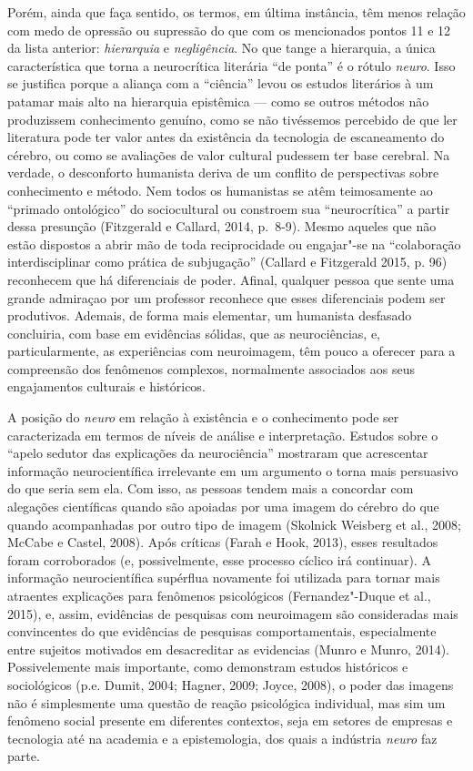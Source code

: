 Porém, ainda que faça sentido, os termos, em última instância, têm menos
relação com medo de opressão ou supressão do que com os mencionados
pontos 11 e 12 da lista anterior: \emph{hierarquia} e
\emph{negligência}. No que tange a hierarquia, a única característica
que torna a neurocrítica literária ``de ponta'' é o rótulo \emph{neuro}.
Isso se justifica porque a aliança com a ``ciência'' levou os estudos
literários à um patamar mais alto na hierarquia epistêmica --- como se
outros métodos não produzissem conhecimento genuíno, como se não
tivéssemos percebido de que ler literatura pode ter valor antes da
existência da tecnologia de escaneamento do cérebro, ou como se
avaliações de valor cultural pudessem ter base cerebral. Na verdade, o
desconforto humanista deriva de um conflito de perspectivas sobre
conhecimento e método. Nem todos os humanistas se atêm teimosamente ao
``primado ontológico'' do sociocultural ou constroem sua
``neurocrítica'' a partir dessa presunção (Fitzgerald e Callard, 2014,
p.~8-9). Mesmo aqueles que não estão dispostos a abrir mão de toda
reciprocidade ou engajar"-se na ``colaboração interdisciplinar como
prática de subjugação'' (Callard e Fitzgerald 2015, p. 96) reconhecem
que há diferenciais de poder. Afinal, qualquer pessoa que sente uma
grande admiraçao por um professor reconhece que esses diferenciais podem
ser produtivos. Ademais, de forma mais elementar, um humanista desfasado
concluiria, com base em evidências sólidas, que as neurociências, e,
particularmente, as experiências com neuroimagem, têm pouco a oferecer
para a compreensão dos fenômenos complexos, normalmente associados aos
seus engajamentos culturais e históricos.

A posição do \emph{neuro} em relação à existência e o conhecimento pode
ser caracterizada em termos de níveis de análise e interpretação.
Estudos sobre o ``apelo sedutor das explicações da neurociência''
mostraram que acrescentar informação neurocientífica irrelevante em um
argumento o torna mais persuasivo do que seria sem ela. Com isso, as
pessoas tendem mais a concordar com alegações científicas quando são
apoiadas por uma imagem do cérebro do que quando acompanhadas por outro
tipo de imagem (Skolnick Weisberg et al., 2008; McCabe e Castel, 2008).
Após críticas (Farah e Hook, 2013), esses resultados foram corroborados
(e, possivelmente, esse processo cíclico irá continuar). A informação
neurocientífica supérflua novamente foi utilizada para tornar mais
atraentes explicações para fenômenos psicológicos (Fernandez"-Duque et
al., 2015), e, assim, evidências de pesquisas com neuroimagem são
consideradas mais convincentes do que evidências de pesquisas
comportamentais, especialmente entre sujeitos motivados em desacreditar
as evidencias (Munro e Munro, 2014). Possivelemente mais importante,
como demonstram estudos históricos e sociológicos (p.e. Dumit, 2004;
Hagner, 2009; Joyce, 2008), o poder das imagens não é simplesmente uma
questão de reação psicológica individual, mas sim um fenômeno social
presente em diferentes contextos, seja em setores de empresas e
tecnologia até na academia e a epistemologia, dos quais a indústria
\emph{neuro} faz parte.

